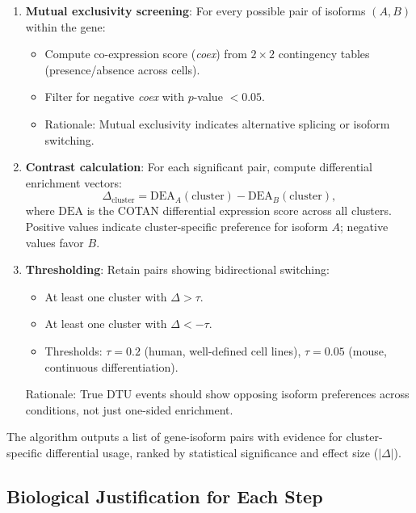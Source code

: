 \begin{enumerate}
    \item \textbf{Mutual exclusivity screening}: For every possible pair of isoforms $(A, B)$ within the gene:
    \begin{itemize}
        \item Compute co-expression score (\textit{coex}) from $2 \times 2$ contingency tables (presence/absence across cells).
        \item Filter for negative \textit{coex} with $p$-value $< 0.05$.
        \item Rationale: Mutual exclusivity indicates alternative splicing or isoform switching.
    \end{itemize}
    
    \item \textbf{Contrast calculation}: For each significant pair, compute differential enrichment vectors:
    \begin{equation}
        \Delta_{\text{cluster}} = \text{DEA}_A(\text{cluster}) - \text{DEA}_B(\text{cluster}),
    \end{equation}
    where $\text{DEA}$ is the COTAN differential expression score across all clusters. Positive values indicate cluster-specific preference for isoform $A$; negative values favor $B$.
    
    \item \textbf{Thresholding}: Retain pairs showing bidirectional switching:
    \begin{itemize}
        \item At least one cluster with $\Delta > \tau$.
        \item At least one cluster with $\Delta < -\tau$.
        \item Thresholds: $\tau = 0.2$ (human, well-defined cell lines), $\tau = 0.05$ (mouse, continuous differentiation).
    \end{itemize}
    Rationale: True DTU events should show opposing isoform preferences across conditions, not just one-sided enrichment.
\end{enumerate}

The algorithm outputs a list of gene-isoform pairs with evidence for cluster-specific differential usage, ranked by statistical significance and effect size ($|\Delta|$).

\subsection*{Biological Justification for Each Step}

